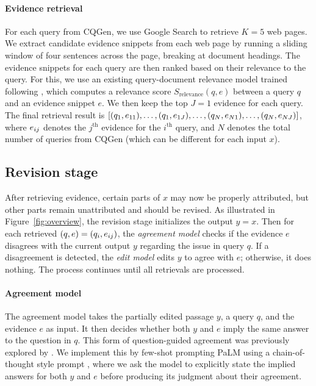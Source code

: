 \paragraph{Evidence retrieval}
For each query from CQGen, we use Google Search to retrieve $K=5$ web pages.
We extract candidate evidence snippets from each web page by running a sliding window of four sentences across the page, breaking at document headings.
The evidence snippets for each query are then ranked based on their relevance to the query. For this, we use an existing query-document relevance model trained following \citet{ni2021gtr}, which computes a relevance score $S_{\text{relevance}}(q, e)$ between a query $q$ and an evidence snippet $e$. We then keep the top $J=1$ evidence for each query. 
The final retrieval result is
$[
(q_1, e_{11}),\allowbreak
\ldots,\allowbreak
(q_1, e_{1J}),\allowbreak
\ldots,\allowbreak
(q_N, e_{N1}),\allowbreak
\dots,\allowbreak
(q_N, e_{NJ})]$,
where $e_{ij}$ denotes the $j^{\text{th}}$ evidence for the $i^{\text{th}}$ query, and $N$ denotes the total number of queries from CQGen (which can be different for each input $x$).


\subsection{Revision stage}\label{sec:approach-editor}

After retrieving evidence, certain parts of $x$ may now be properly attributed, but other parts remain unattributed and should be revised.
As illustrated in Figure~\ref{fig:overview},
the revision stage initializes the output $y = x$. Then for each retrieved $(q, e) = (q_i, e_{ij})$,
the \emph{agreement model} checks if the evidence $e$ disagrees with the current output $y$ regarding the issue in query $q$. If a disagreement is detected, the \emph{edit model} edits $y$ to agree with $e$; otherwise, it does nothing. The process continues until all retrievals are processed.

\paragraph{Agreement model}
The agreement model takes the partially edited passage $y$, a query $q$, and the evidence $e$ as input. It then decides whether both $y$ and $e$ imply the same answer to the question in $q$. This form of question-guided agreement was previously explored by \citet{honovich2021q2}.
We implement this by few-shot prompting PaLM using a chain-of-thought style prompt \cite{Wei2022COT}, where we ask the model to explicitly state the implied answers for both $y$ and $e$ before producing its judgment about their agreement. %

